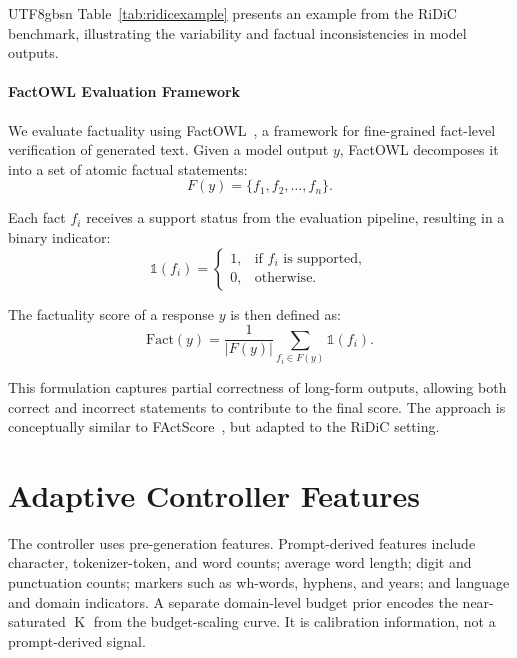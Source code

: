 \documentclass[11pt]{article}
\begin{document}
\begin{CJK*}{UTF8}{gbsn}
Table~\ref{tab:ridicexample} presents an example from the RiDiC benchmark, illustrating the variability and factual inconsistencies in model outputs. 

\paragraph{FactOWL Evaluation Framework}

We evaluate factuality using FactOWL~\citep{factowl}, a framework for
fine-grained fact-level verification of generated text. Given a model output $y$,
FactOWL decomposes it into a set of atomic factual statements:
\begin{equation}
    F(y) = \{f_1, f_2, \dots, f_n\}.    
\end{equation}


Each fact $f_i$ receives a support status from the evaluation pipeline,
resulting in a binary indicator:
\begin{equation}
\mathbb{1}(f_i) =
\begin{cases}
1, & \text{if } f_i \text{ is supported}, \\
0, & \text{otherwise}.
\end{cases}
\end{equation}

The factuality score of a response $y$ is then defined as:
\begin{equation}
    \text{Fact}(y) = \frac{1}{|F(y)|} \sum_{f_i \in F(y)} \mathbb{1}(f_i).
\end{equation}

This formulation captures partial correctness of long-form outputs, allowing both correct and incorrect statements to contribute to the final score. The approach is conceptually similar to FActScore~\citep{min-etal-2023-factscore}, but adapted to the RiDiC setting.


\section{Adaptive Controller Features}
\label{app:features}

The controller uses pre-generation features. Prompt-derived features include character, tokenizer-token, and word counts; average word length; digit and punctuation counts; markers such as wh-words, hyphens, and years; and language and domain indicators. A separate domain-level budget prior encodes the near-saturated $\operatorname{K}$ from the budget-scaling curve. It is calibration information, not a prompt-derived signal.


\end{CJK*}
\end{document}
